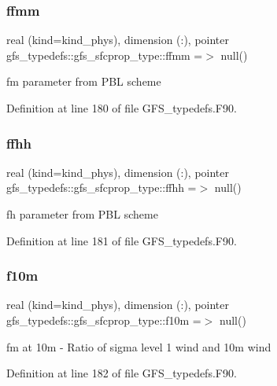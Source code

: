 \subsubsection{ffmm}
{\footnotesize\ttfamily real (kind=kind\+\_\+phys), dimension   (\+:), pointer gfs\+\_\+typedefs\+::gfs\+\_\+sfcprop\+\_\+type\+::ffmm =$>$ null()}



fm parameter from P\+BL scheme 



Definition at line 180 of file G\+F\+S\+\_\+typedefs.\+F90.

\mbox{\label{structgfs__typedefs_1_1gfs__sfcprop__type_abe98c18cb9965f62c141279da2699934}} 
\subsubsection{ffhh}
{\footnotesize\ttfamily real (kind=kind\+\_\+phys), dimension   (\+:), pointer gfs\+\_\+typedefs\+::gfs\+\_\+sfcprop\+\_\+type\+::ffhh =$>$ null()}



fh parameter from P\+BL scheme 



Definition at line 181 of file G\+F\+S\+\_\+typedefs.\+F90.

\mbox{\label{structgfs__typedefs_1_1gfs__sfcprop__type_aeca19cd0bf7fbb77d8742b1ca44e8161}} 
\subsubsection{f10m}
{\footnotesize\ttfamily real (kind=kind\+\_\+phys), dimension   (\+:), pointer gfs\+\_\+typedefs\+::gfs\+\_\+sfcprop\+\_\+type\+::f10m =$>$ null()}



fm at 10m -\/ Ratio of sigma level 1 wind and 10m wind 



Definition at line 182 of file G\+F\+S\+\_\+typedefs.\+F90.

\mbox{\label{structgfs__typedefs_1_1gfs__sfcprop__type_a09c2381cec4bfd894456d1a83f7fd951}} 
